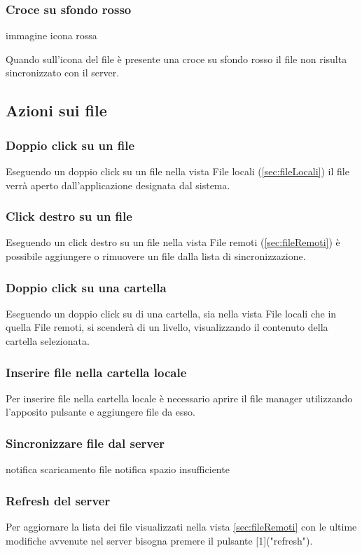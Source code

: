 \subsubsection{Croce su sfondo rosso}

immagine icona rossa\newline

Quando sull'icona del file è presente una croce su sfondo rosso il file non risulta sincronizzato con il server.

\subsection{Azioni sui file}
\label{sec:fileActions}

\subsubsection*{Doppio click su un file}
Eseguendo un doppio click su un file nella vista File locali (\ref{sec:fileLocali}) il file verrà aperto dall'applicazione designata dal sistema.
\subsubsection{Click destro su un file}
Eseguendo un click destro su un file nella vista File remoti (\ref{sec:fileRemoti}) è possibile aggiungere o rimuovere un file dalla lista di sincronizzazione.
\subsubsection{Doppio click su una cartella}
Eseguendo un doppio click su di una cartella, sia nella vista File locali che in quella File remoti, si scenderà di un livello, visualizzando il contenuto della cartella selezionata.
\subsubsection{Inserire file nella cartella locale}
Per inserire file nella cartella locale è necessario aprire il file manager utilizzando l'apposito pulsante e aggiungere file da esso.
\subsubsection{Sincronizzare file dal server}
notifica scaricamento file \newline
notifica spazio insufficiente
\subsubsection{Refresh del server}
Per aggiornare la lista dei file visualizzati nella vista \ref{sec:fileRemoti} con le ultime modifiche avvenute nel server bisogna premere il pulsante [1]("refresh").
